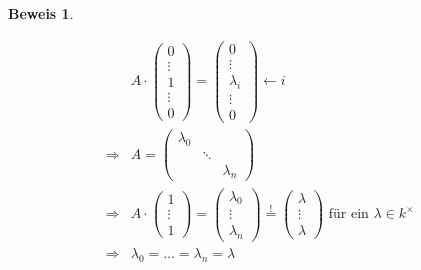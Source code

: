 \documentclass[a4paper,12pt]{report}
\theoremstyle{break}
\theoremstyle{nonumberbreak}
\theoremstyle{nonumberplain}
\newtheorem{Bew}{Beweis}
\begin{document}
\begin{Bew}
\begin{description}
\begin{align*}
& A \cdot \begin{pmatrix} 0\\\vdots\\ 1 \\ \vdots\\ 0 \end{pmatrix} = \begin{pmatrix} 0\\ \vdots\\ \lambda_i \\ \vdots \\ 0 \end{pmatrix} \leftarrow i\\
\Rightarrow & A = \begin{pmatrix} \lambda_0 & & \\ & \ddots & \\ & & \lambda_n \end{pmatrix}\\
\Rightarrow & A \cdot \begin{pmatrix} 1\\ \vdots \\ 1 \end{pmatrix} = \begin{pmatrix} \lambda_0 \\ \vdots \\ \lambda_n \end{pmatrix} \overset{!}{=} \begin{pmatrix} \lambda \\ \vdots \\ \lambda \end{pmatrix} \text{ für ein } \lambda \in k^\times\\
\Rightarrow &\lambda_0 = \dots = \lambda_n = \lambda
\end{align*}
\end{description}
\end{Bew}
\end{document}
